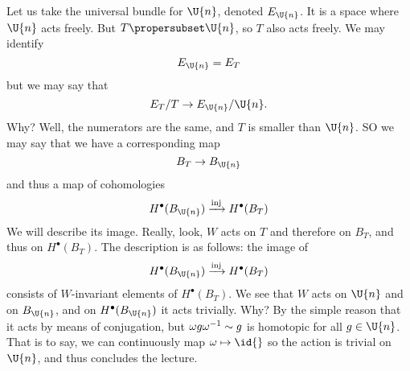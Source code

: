 Let us take the universal bundle for $\U{n}$, denoted
$E_{\U{n}}$. It is a space where $\U{n}$ acts freely. But
$T\propersubset\U{n}$, so $T$ also acts freely. We may identify
\begin{equation}
E_{\U{n}}=E_{T}
\end{equation}
but we may say that
\begin{equation}
E_{T}/T\to E_{\U{n}}/\U{n}.
\end{equation}
Why? Well, the numerators are the same, and $T$ is smaller than
$\U{n}$. SO we may say that we have a corresponding map 
\begin{equation}
B_{T}\to B_{\U{n}}
\end{equation}
and thus a map of cohomologies
\begin{equation}
H^{\bullet}(B_{\U{n}})\xrightarrow{\text{inj}}H^{\bullet}(B_{T})
\end{equation}
We will describe its image. Really, look, $W$ acts
on $T$ and therefore on $B_{T}$, and thus on $H^{\bullet}(B_{T})$.
The description is as follows: the image of
\begin{equation}
H^{\bullet}(B_{\U{n}})\xrightarrow{\text{inj}}H^{\bullet}(B_{T})
\end{equation}
consists of $W$-invariant elements of $H^{\bullet}(B_{T})$. We
see that $W$ acts on $\U{n}$ and on $B_{\U{n}}$, and on
$H^{\bullet}(B_{\U{n}})$ it acts trivially. Why? By the simple
reason that it acts by means of conjugation, but $\omega
g\omega^{-1}\sim g$ is homotopic for all $g\in\U{n}$. That
is to say, we can continuously map $\omega\mapsto\id{}$ so the
action is trivial on $\U{n}$, and thus concludes the lecture.
